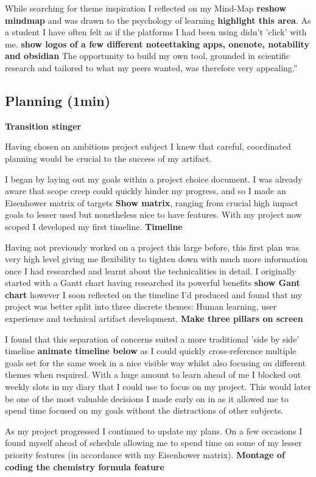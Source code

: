 While searching for theme inspiration I reflected on my Mind-Map \textbf{reshow mindmap} and was drawn to the psychology of learning \textbf{highlight this area}. As a student I have often felt as if the platforms I had been using didn't 'click' with me. \textbf{show logos of a few different noteettaking apps, onenote, notability and obsidian} The opportunity to build my own tool, grounded in scientific research and tailored to what my peers wanted, was therefore very appealing.”

\subsection*{Planning (1min)}
\textbf{Transition stinger}

Having chosen an ambitious project subject I knew that careful, coordinated planning would be crucial to the success of my artifact.
 
I began by laying out my goals within a project choice document. I was already aware that scope creep could quickly hinder my progress, and so I made an Eisenhower matrix of targets \textbf{Show matrix}, ranging from crucial high impact goals to lesser used but nonetheless nice to have features. With my project now scoped I developed my first timeline. \textbf{Timeline}
 
Having not previously worked on a project this large before, this first plan was very high level giving me flexibility to tighten down with much more information once I had researched and learnt about the technicalities in detail. I originally started with a Gantt chart having researched its powerful benefits \textbf{show Gant chart} however I soon reflected on the timeline I'd produced and found that my project was better split into three discrete themes: Human learning, user experience and technical artifact development. \textbf{Make three pillars on screen}

I found that this separation of concerns suited a more traditional 'side by side' timeline \textbf{animate timeline below}  as I could quickly cross-reference multiple goals set for the same week in a nice visible way whilst also focusing on different themes when required. With a huge amount to learn ahead of me I blocked out weekly slots in my diary that I could use to focus on my project. This would later be one of the most valuable decisions I made early on in  as it allowed me to spend time focused on my goals without the distractions of other subjects.

As my project progressed I continued to update my plans. On a few occasions I found myself ahead of schedule allowing me to spend time on some of my lesser priority features (in accordance with my Eisenhower matrix). \textbf{Montage of coding the chemistry formula feature}

